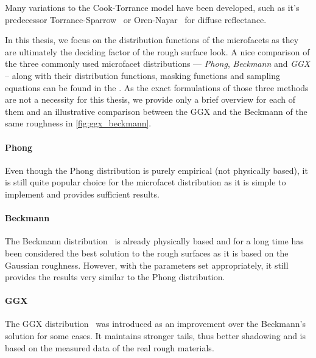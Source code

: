 Many variations to the Cook-Torrance model have been developed, such as it's predecessor Torrance-Sparrow~\cite{Torrance1967TheoryFO} or Oren-Nayar~\cite{oren1994generalization} for diffuse reflectance.

In this thesis, we focus on the distribution functions of the microfacets as they are ultimately the deciding factor of the rough surface look. A nice comparison of the three commonly used microfacet distributions --- \emph{Phong}, \emph{Beckmann} and \emph{GGX} -- along with their distribution functions, masking functions and sampling equations can be found in the \citet{walter2007microfacet}. As the exact formulations of those three methods are not a necessity for this thesis, we provide only a brief overview for each of them and an illustrative comparison between the GGX and the Beckmann of the same roughness in 
\autoref{fig:ggx_beckmann}.

\paragraph{Phong}

Even though the Phong distribution is purely empirical (not physically based), it is still quite popular choice for the microfacet distribution as it is simple to implement and provides sufficient results.

\paragraph{Beckmann}

The Beckmann distribution~\cite{beckmann1987scattering} is already physically based and for a long time has been considered the best solution to the rough surfaces as it is based on the Gaussian roughness. However, with the parameters set appropriately, it still provides the results very similar to the Phong distribution.

\paragraph{GGX}

The GGX distribution~\cite{walter2007microfacet} was introduced as an improvement over the Beckmann's solution for some cases. It maintains stronger tails, thus better shadowing and is based on the measured data of the real rough materials.

